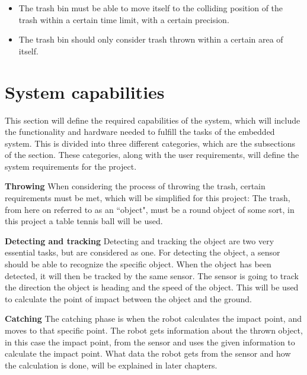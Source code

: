 \begin{itemize}
	\item The trash bin must be able to move itself to the colliding position of the trash within a certain time limit, with a certain precision.
	\item The trash bin should only consider trash thrown within a certain area of itself.
\end{itemize}

\section{System capabilities}
\label{sec:System capabilities}
This section will define the required capabilities of the system, which will include the functionality and hardware needed to fulfill the tasks of the embedded system. This is divided into three different categories, which are the subsections of the section. These categories, along with the user requirements, will define the system requirements for the project. 

\textbf{Throwing}\newline
When considering the process of throwing the trash, certain requirements must be met, which will be simplified for this project:
The trash, from here on referred to as an “object", must be a round object of some sort, in this project a table tennis ball will be used.  \newline


\textbf{Detecting and tracking}\newline
Detecting and tracking the object are two very essential tasks, but are considered as one. For detecting the object, a sensor should be able to recognize the specific object. \newline
When the object has been detected, it will then be tracked by the same sensor. The sensor is going to track the direction the object is heading and the speed of the object. This will be used to calculate the point of impact between the object and the ground.

\textbf{Catching}\newline
The catching phase is when the robot calculates the impact point, and moves to that specific point. The robot gets information about the thrown object, in this case the impact point, from the sensor and uses the given information to calculate the impact point. What data the robot gets from the sensor and how the calculation is done, will be explained in later chapters. 

